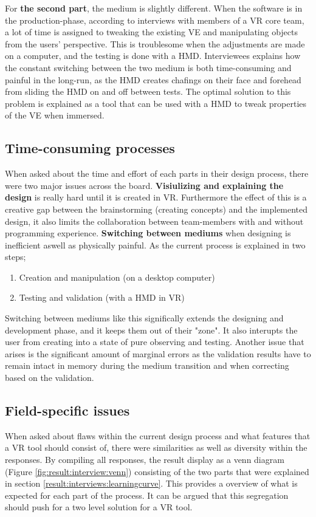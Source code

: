  For \textbf{the second part}, the medium is slightly different. When the software is in the production-phase, according to interviews with members of a VR core team, a lot of time is assigned to tweaking the existing VE and manipulating objects from the users' perspective. This is troublesome when the adjustments are made on a computer, and the testing is done with a HMD. Interviewees explains how the constant switching between the two medium is both time-consuming and painful in the long-run, as the HMD creates chafings on their face and forehead from sliding the HMD on and off between tests. The optimal solution to this problem is explained as a tool that can be used with a HMD to tweak properties of the VE when immersed.
 \subsection{Time-consuming processes}
 When asked about the time and effort of each parts in their design process, there were two major issues across the board. \textbf{Visiulizing and explaining the design} is really hard until it is created in VR. Furthermore the effect of this is a creative gap between the brainstorming (creating concepts) and the implemented design, it also limits the collaboration between team-members with and without programming experience. \textbf{Switching between mediums} when designing is inefficient aswell as physically painful. As the current process is explained in two steps; \begin{enumerate}
   \item Creation and manipulation (on a desktop computer)
   \item Testing and validation (with a HMD in VR)
 \end{enumerate}
Switching between mediums like this significally extends the designing and development phase, and it keeps them out of their "zone". It also interupts the user from creating into a state of pure observing and testing. Another issue that arises is the significant amount of marginal errors as the validation results have to remain intact in memory during the medium transition and when correcting based on the validation.
\subsection{Field-specific issues}
When asked about flaws within the current design process and what features that a VR tool should consist of, there were similarities as well as diversity within the responses. By compiling all responses, the result display as a venn diagram (Figure \ref{fig:result:interview:venn}) consisting of the two parts that were explained in section \ref{result:interviews:learningcurve}. This provides a overview of what is expected for each part of the process. It can be argued that this segregation should push for a two level solution for a VR tool.
